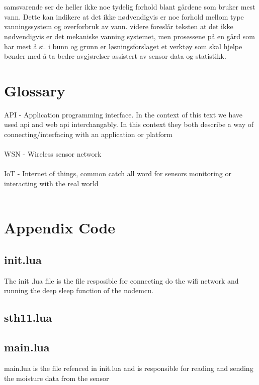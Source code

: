 \documentclass[]{uiophd}
\begin{document}
\\\\
 samsvarende ser de heller ikke noe tydelig forhold blant gårdene som bruker mest vann. Dette kan indikere at det ikke nødvendigvis er noe forhold mellom type vanningssystem og overforbruk av vann.  videre foreslår teksten at det ikke nødvendigvis er  det mekaniske vanning systemet,  men prosessene på en gård som har mest å si.  i bunn og grunn er  løsningsforslaget et verktøy  som skal hjelpe bønder med å ta bedre avgjørelser assistert av sensor data og statistikk. 

\chapter{Glossary}
API - Application programming interface. In the context of this text we have used api and web api interchangably. In this context they both describe a way of connecting/interfacing with an application or platform
\\\\
WSN - Wireless sensor network
\\\\
IoT - Internet of things, common catch all word for sensors monitoring or interacting with the real world
\\\\



\chapter{Appendix Code}
\linespread{1}

\section{init.lua}
The init .lua file is the file resposible for connecting do the wifi network and running the deep sleep function of the nodemcu.


\section{sth11.lua}


\section{main.lua}
main.lua is the file refenced in init.lua and is responsible for reading and sending the moisture data from the sensor

\end{document}
